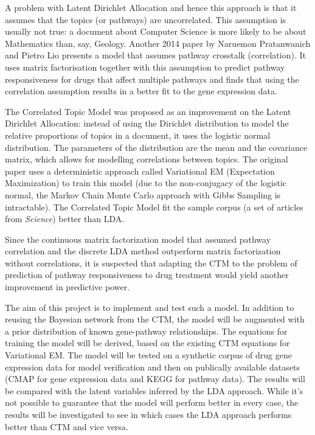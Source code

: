\documentclass[12pt,a4]{article}
\begin{document}
A problem with Latent Dirichlet Allocation and hence this approach is that it assumes that the topics (or pathways) are uncorrelated. This assumption is usually not true: a document about Computer Science is more likely to be about Mathematics than, say, Geology. Another 2014 paper\cite{C4MB00014E} by Naruemon Pratanwanich and Pietro Lio presents a model that assumes pathway crosstalk (correlation). It uses matrix factorisation together with this assumption to predict pathway responsiveness for drugs that affect multiple pathways and finds that using the correlation assumption results in a better fit to the gene expression data.

The Correlated Topic Model\cite{2007} was proposed as an improvement on the Latent Dirichlet Allocation: instead of using the Dirichlet distribution to model the relative proportions of topics in a document, it uses the logistic normal distribution. The parameters of the distribution are the mean and the covariance matrix, which allows for modelling correlations between topics. The original paper\cite{2007} uses a deterministic approach called Variational EM (Expectation Maximization) to train this model (due to the non-conjugacy of the logistic normal, the Markov Chain Monte Carlo approach with Gibbs Sampling is intractable). The Correlated Topic Model fit the sample corpus (a set of articles from \textit{Science}) better than LDA\cite{2007}.

Since the continuous matrix factorization model that assumed pathway correlation\cite{C4MB00014E} and the discrete LDA method\cite{Pratanwanich2014} outperform matrix factorization without correlations, it is suspected that adapting the CTM to the problem of prediction of pathway responsiveness to drug treatment would yield another improvement in predictive power.

The aim of this project is to implement and test such a model. In addition to reusing the Bayesian network from the CTM, the model will be augmented with a prior distribution of known gene-pathway relationships. The equations for training the model will be derived, based on the existing CTM equations for Variational EM\cite{2007}. The model will be tested on a synthetic corpus of drug gene expression data for model verification and then on publically available datasets (CMAP\cite{CMap} for gene expression data and KEGG\cite{KEGG} for pathway data). The results will be compared with the latent variables inferred by the LDA approach. While it's not possible to guarantee that the model will perform better in every case, the results will be investigated to see in which cases the LDA approach performs better than CTM and vice versa.
\end{document}
